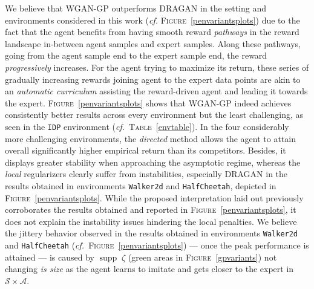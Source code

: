 We believe that WGAN-GP outperforms DRAGAN in the setting and environments considered in this work
(\textit{cf.} \textsc{Figure}~\ref{penvariantsplots})
due to the fact that the agent benefits from having smooth reward \emph{pathways}
in the reward landscape in-between agent samples and expert samples.
Along these pathways, going from the agent sample end to the expert sample end, the
reward \emph{progressively} increases.
For the agent trying to maximize its return,
these series of gradually increasing rewards joining agent to the expert data points
are akin to an \emph{automatic curriculum} \cite{Karpathy2012-qt,OpenAI2019-vy}
assisting the reward-driven agent and
leading it towards the expert.
\textsc{Figure}~\ref{penvariantsplots} shows that WGAN-GP indeed achieves consistently
better results across every environment
but the least challenging, as seen in the \texttt{IDP} environment
(\textit{cf.}~\textsc{Table}~\ref{envtable}).
In the four considerably more challenging environments, the \emph{directed} method
allows the agent to attain overall significantly higher empirical return than its competitors.
Besides, it displays greater stability when approaching the asymptotic regime,
whereas the \emph{local} regularizers clearly suffer from instabilities,
especially DRAGAN in the results obtained in environments \texttt{Walker2d} and \texttt{HalfCheetah},
depicted in \textsc{Figure}~\ref{penvariantsplots}.
While the proposed interpretation laid out previously
corroborates the results obtained and reported in \textsc{Figure}~\ref{penvariantsplots},
it does not explain the instability issues hindering the local penalties.
We believe the jittery behavior observed in
the results obtained in environments \texttt{Walker2d} and \texttt{HalfCheetah}
(\textit{cf.}~\textsc{Figure}~\ref{penvariantsplots}) ---
once the peak performance is attained ---
is caused by $\operatorname{supp} \; \zeta$
(green areas in \textsc{Figure}~\ref{gpvariants})
not changing \emph{is size}
as the agent learns to imitate
and gets closer to the expert in $\mathcal{S} \times \mathcal{A}$.

